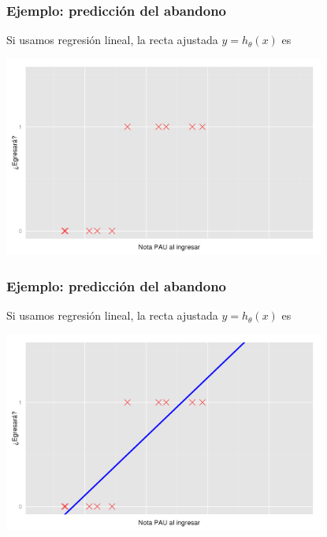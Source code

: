\documentclass{beamer}
\begin{document}
 \begin{frame}\frametitle{Ejemplo: predicción del abandono}
   \begin{overlayarea}{\textwidth}{0.6cm}
  Si usamos regresión lineal, la recta ajustada $y=h_\theta(x)$ es
 \end{overlayarea}
 \begin{center}
  \includegraphics[height=6.6cm]{egresara1.png}
\end{center}
   
 \end{frame}
 \begin{frame}\frametitle{Ejemplo: predicción del abandono}
   \begin{overlayarea}{\textwidth}{0.6cm}  
   Si usamos regresión lineal, la recta ajustada $y=h_\theta(x)$ es
 \end{overlayarea}
 \begin{center}
  \includegraphics[height=6.6cm]{egresara2.png}
\end{center}
  \end{frame}
  
\end{document}
